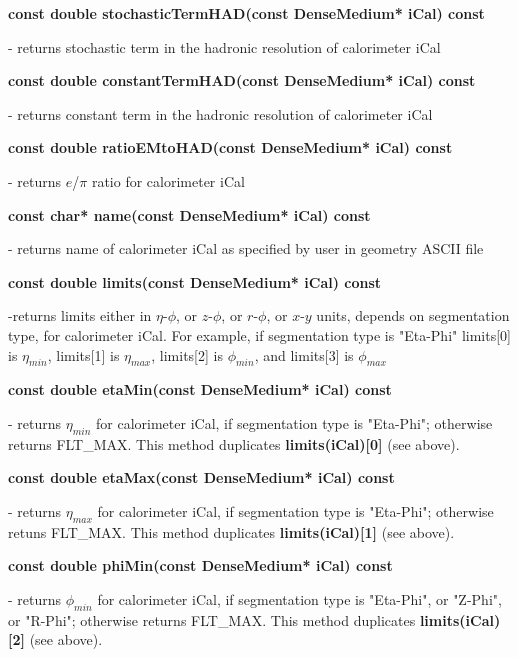 \begin{center}
   {\bf const double stochasticTermHAD(const DenseMedium* iCal) const }
\end{center}
   - returns stochastic term in the hadronic
   resolution of calorimeter iCal 

\begin{center}
   {\bf const double constantTermHAD(const DenseMedium* iCal) const }
\end{center}
   - returns constant term in the hadronic
   resolution of calorimeter iCal 

\begin{center}
   {\bf const double ratioEMtoHAD(const DenseMedium* iCal) const }
\end{center}
   - returns $e$/$\pi$ ratio for calorimeter iCal 

\begin{center}
   {\bf const char* name(const DenseMedium* iCal) const }
\end{center}
   - returns name of calorimeter iCal as specified by user in geometry ASCII file
   
\begin{center}
   {\bf const double limits(const DenseMedium* iCal) const }
\end{center}
   -returns limits either in $\eta$-$\phi$, or $z$-$\phi$, or $r$-$\phi$, or $x$-$y$ units,
    depends on segmentation type, for calorimeter iCal. For example, if segmentation type
    is "Eta-Phi" limits[0] is $\eta_{min}$, limits[1] is $\eta_{max}$, limits[2] is $\phi_{min}$,
    and limits[3] is $\phi_{max}$


\begin{center}   
   {\bf const double etaMin(const DenseMedium* iCal) const }
\end{center}
   - returns $\eta_{min}$ for calorimeter iCal, if segmentation type is "Eta-Phi";
   otherwise returns FLT\_MAX. This method duplicates {\bf limits(iCal)[0]}
   (see above). 

\begin{center}
   {\bf const double etaMax(const DenseMedium* iCal) const }
\end{center}
   - returns $\eta_{max}$ for calorimeter iCal, if segmentation type is "Eta-Phi";
   otherwise retuns FLT\_MAX. This method duplicates {\bf limits(iCal)[1]}
   (see above).

\begin{center}   
   {\bf const double phiMin(const DenseMedium* iCal) const }
\end{center}
   - returns $\phi_{min}$ for calorimeter iCal, if segmentation type is "Eta-Phi",
   or "Z-Phi", or "R-Phi";
   otherwise returns FLT\_MAX. This method duplicates {\bf limits(iCal)[2]}
   (see above). 

